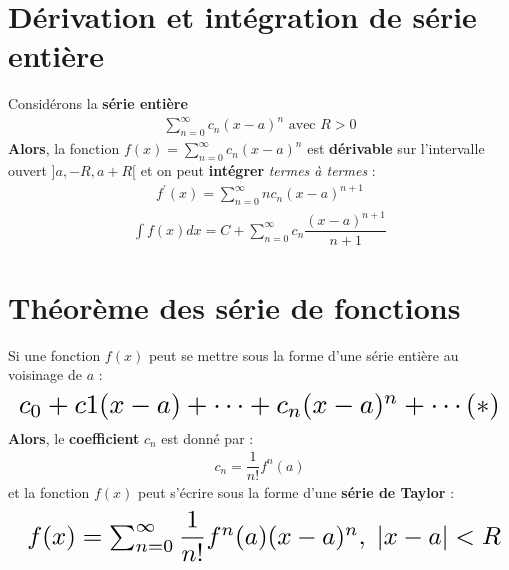 \documentclass{report}
\begin{document}
\begin{multicols*}{3}
    \vspace{-1em}
    \section{Dérivation et intégration de série entière}
    \vspace{-2em}
        Considérons la \textbf{série entière} 
        \begin{align*}
            \sum\limits_{n = 0}^{\infty}c_n(x - a)^n \text{ avec } R > 0
        \end{align*}                
        \textbf{Alors}, la fonction $f(x) =  \sum_{n=0}^{\infty }c_n(x - a)^n$ 
        est \textbf{\textcolor{myb}{dérivable}} 
        sur l'intervalle ouvert $]a, -R, a + R[$ et on peut 
        \textcolor{myb}{\textbf{intégrer}}    \textit{termes à termes} :  
        \begin{align*}
            f^{\prime}(x) = \sum_{n=0}^{\infty }nc_n(x - a)^{n + 1}
        \end{align*}
        \vspace{-1em} 
        \begin{align*}
            \int f(x)dx  = C + \sum_{n=0}^{\infty }c_n
            \dfrac{(x - a)^{n+1}}{n+1} 
        \end{align*}    



    \section{Théorème des série de fonctions}
        Si une fonction \( f(x) \) peut se mettre sous la forme d'une série entière 
        au voisinage de \( a \) :
        \begin{align*}
        \resizebox{\linewidth}{!}{$
            c_0 + c1(x - a) +  \cdots + c_n (x - a)^n + \cdots (*)
        $}
        \end{align*}
        \textbf{Alors}, le \textcolor{myb}{\textbf{coefficient }} 
        \( c_n \) est donné par : 
        \begin{align*}
            c_n = \dfrac{1}{n!}f^{n}(a) 
        \end{align*}
        et la fonction \( f(x) \) peut s'écrire sous la forme d'une 
        \textcolor{myb}{\textbf{série de Taylor }}: 
        \begin{align*}
            \resizebox{\linewidth}{!}{ $
            f(x) = \sum_{n= 0}^{\infty }\dfrac{1}{n!}f^{n}(a)(x - a)^n, \; |x - a| < R 
        $}
        \end{align*}



\end{multicols*}
\end{document}
